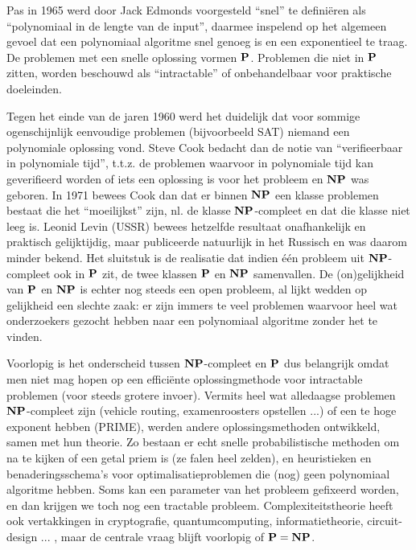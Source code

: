 Pas in 1965 werd door Jack Edmonds voorgesteld ``snel'' te
defini\"eren als ``polynomiaal in de lengte van de input'', daarmee
inspelend op het algemeen gevoel dat een polynomiaal algoritme snel
genoeg is en een exponentieel te traag. De problemen met een snelle
oplossing vormen $\P$. Problemen die niet in $\P$ zitten, worden
beschouwd als ``intractable'' of onbehandelbaar voor praktische
doeleinden.

Tegen het einde van de jaren 1960 werd het duidelijk dat voor sommige
ogenschijnlijk eenvoudige problemen (bijvoorbeeld SAT) niemand een
polynomiale oplossing vond. Steve Cook bedacht dan de notie van
``verifieerbaar in polynomiale tijd'', t.t.z. de problemen waarvoor in
polynomiale tijd kan geverifieerd worden of iets een oplossing is voor
het probleem en $\NP$ was geboren. In 1971 bewees Cook dan dat er
binnen $\NP$ een klasse problemen bestaat die het ``moeilijkst'' zijn,
nl. de klasse $\NP$-compleet en dat die klasse niet leeg is. Leonid
Levin (USSR) bewees hetzelfde resultaat onafhankelijk en praktisch
gelijktijdig, maar publiceerde natuurlijk in het Russisch en was
daarom minder bekend. Het sluitstuk is de realisatie dat indien
\'{e}\'{e}n probleem uit $\NP$-compleet ook in $\P$ zit, de twee
klassen $\P$ en $\NP$ samenvallen. De (on)gelijkheid van $\P$ en $\NP$
is echter nog steeds een open probleem, al lijkt wedden op gelijkheid
een slechte zaak: er zijn immers te veel problemen waarvoor heel wat
onderzoekers gezocht hebben naar een polynomiaal algoritme zonder het
te vinden.

Voorlopig is het onderscheid tussen $\NP$-compleet en $\P$ dus
belangrijk omdat men niet mag hopen op een effici\"ente
oplossingmethode voor intractable problemen (voor steeds grotere
invoer). Vermits heel wat alledaagse problemen $\NP$-compleet zijn
(vehicle routing, examenroosters opstellen ...) of een te hoge
exponent hebben (PRIME), werden andere oplossingsmethoden ontwikkeld,
samen met hun theorie. Zo bestaan er echt snelle probabilistische
methoden om na te kijken of een getal priem is (ze falen heel zelden),
en heuristieken en benaderingsschema's voor optimalisatieproblemen die
(nog) geen polynomiaal algoritme hebben. Soms kan een parameter van het
probleem gefixeerd worden, en dan krijgen we toch nog een tractable
probleem. Complexiteitstheorie heeft ook vertakkingen in cryptografie,
quantumcomputing, informatietheorie, circuit-design ... , maar de
centrale vraag blijft voorlopig of $\P = \NP$.

